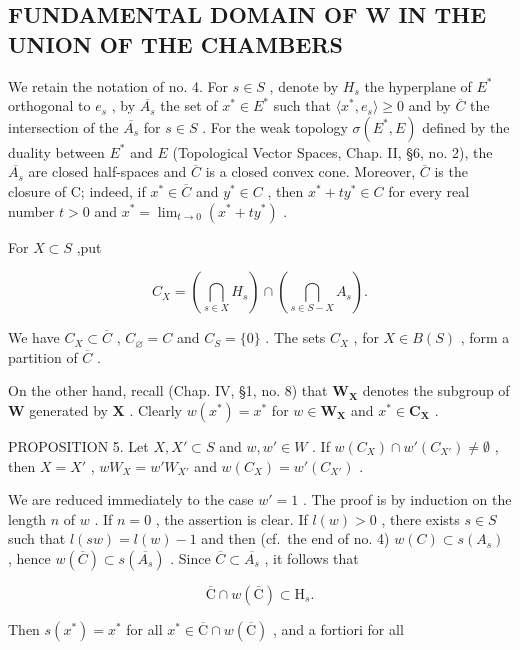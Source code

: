 \subsection{FUNDAMENTAL DOMAIN OF W IN THE UNION OF THE CHAMBERS}

We retain the notation of no. 4. For \(s \in S\) , denote by \(H_s\) the hyperplane of \(E^*\) orthogonal to \(e_s\) , by \(\overline{A_s}\) the set of \(x^* \in E^*\) such that \(\langle x^*, e_s \rangle \geqslant 0\) and by \(\overline{C}\) the intersection of the \(\overline{A_s}\) for \(s \in S\) . For the weak topology \(\sigma(E^*, E)\) defined by the duality between \(E^*\) and \(E\) (Topological Vector Spaces, Chap. II, §6, no. 2), the \(\overline{A_s}\) are closed half-spaces and \(\overline{C}\) is a closed convex cone. Moreover, \(\overline{C}\) is the closure of C; indeed, if \(x^* \in \overline{C}\) and \(y^* \in C\) , then \(x^* + ty^* \in C\) for every real number \(t > 0\) and \(x^* = \lim_{t \to 0} (x^* + ty^*)\) .

For \(X\subset S\) ,put

\[
C _ {X} = \left(\bigcap_ {s \in X} H _ {s}\right) \cap \left(\bigcap_ {s \in S - X} A _ {s}\right).
\]

We have \(C_X \subset \overline{C}\) , \(C_{\varnothing} = C\) and \(C_S = \{0\}\) . The sets \(C_X\) , for \(X \in B(S)\) , form a partition of \(\overline{C}\) .

On the other hand, recall (Chap. IV, §1, no. 8) that \(\mathbf{W}_{\mathbf{X}}\) denotes the subgroup of \(\mathbf{W}\) generated by \(\mathbf{X}\) . Clearly \(w(x^{*}) = x^{*}\) for \(w \in \mathbf{W}_{\mathbf{X}}\) and \(x^{*} \in \mathbf{C}_{\mathbf{X}}\) .

PROPOSITION 5. Let \(X, X' \subset S\) and \(w, w' \in W\) . If \(w(C_X) \cap w'(C_{X'}) \neq \emptyset\) , then \(X = X'\) , \(wW_X = w'W_{X'}\) and \(w(C_X) = w'(C_{X'})\) .

We are reduced immediately to the case \(w' = 1\) . The proof is by induction on the length \(n\) of \(w\) . If \(n = 0\) , the assertion is clear. If \(l(w) > 0\) , there exists \(s \in S\) such that \(l(sw) = l(w) - 1\) and then (cf.~the end of no. 4) \(w(C) \subset s(A_s)\) , hence \(w(\overline{C}) \subset s(\overline{A_s})\) . Since \(\overline{C} \subset \overline{A_s}\) , it follows that

\[
\overline {{{\mathrm{C}}}} \cap w (\overline {{{\mathrm{C}}}}) \subset \mathrm{H} _ {s}.
\]

Then \(s(x^{*}) = x^{*}\) for all \(x^{*} \in \overline{\mathrm{C}} \cap w(\overline{\mathrm{C}})\) , and a fortiori for all

